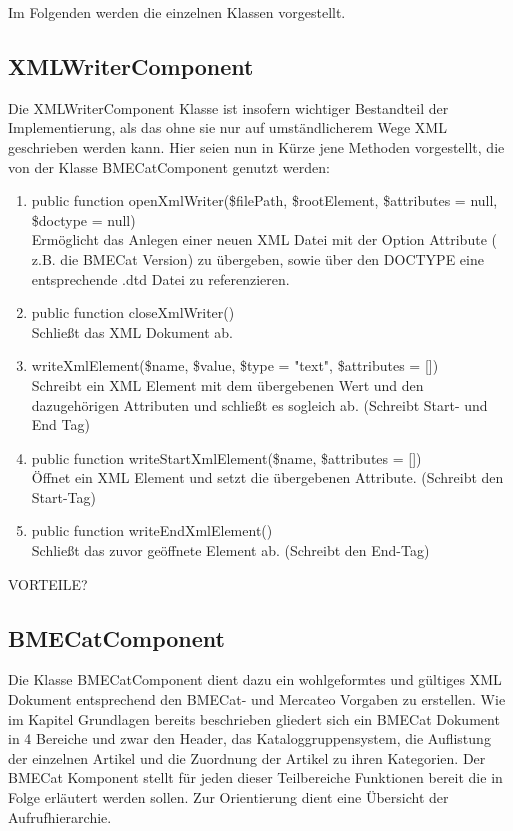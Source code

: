 	
	
	
	Im Folgenden werden die einzelnen Klassen vorgestellt.
	
	\subsection{XMLWriterComponent}
	
	Die XMLWriterComponent Klasse ist insofern wichtiger Bestandteil der Implementierung, als das ohne sie nur auf umständlicherem Wege XML geschrieben werden kann. Hier seien nun in Kürze jene Methoden vorgestellt, die von der Klasse BMECatComponent genutzt werden:
	
	\begin{enumerate}[noitemsep]
	\item public function openXmlWriter(\$filePath, \$rootElement, \$attributes = null, \$doctype = null) \\
		  Ermöglicht das Anlegen einer neuen XML Datei mit der Option Attribute ( z.B. die BMECat Version) zu übergeben, sowie über den DOCTYPE eine entsprechende .dtd Datei zu referenzieren.
	\item public function closeXmlWriter() \\
		  Schließt das XML Dokument ab.
	\item writeXmlElement(\$name, \$value, \$type = "text", \$attributes = [])\\
		  Schreibt ein XML Element mit dem übergebenen Wert und den dazugehörigen Attributen und schließt es sogleich ab. (Schreibt Start- und End Tag)
	\item public function writeStartXmlElement(\$name, \$attributes = [])\\
		  Öffnet ein XML Element und setzt die übergebenen Attribute. (Schreibt den Start-Tag)
	\item public function writeEndXmlElement()\\
		  Schließt das zuvor geöffnete Element ab. (Schreibt den End-Tag)
	\end{enumerate}
	
	VORTEILE? 
	
	\subsection{BMECatComponent}
	
	Die Klasse BMECatComponent dient dazu ein wohlgeformtes und gültiges XML Dokument entsprechend den BMECat- und Mercateo Vorgaben zu erstellen. Wie im Kapitel Grundlagen bereits beschrieben gliedert sich ein BMECat Dokument in 4 Bereiche und zwar den Header, das Kataloggruppensystem, die Auflistung der einzelnen Artikel und die Zuordnung der Artikel zu ihren Kategorien. Der BMECat Komponent stellt für jeden dieser Teilbereiche Funktionen bereit die in Folge erläutert werden sollen.
	Zur Orientierung dient eine Übersicht der Aufrufhierarchie.\\
	
